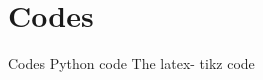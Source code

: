 \documentclass{beamer}
\begin{document}
 \section{Codes}
\begin{frame}{Codes}
Python code
\href{https://github.com/Panisha707/ASSIGNMENT02/blob/main/untitled18.py}{}
\newline
The latex- tikz code 
\href{https://github.com/Panisha707/ASSIGNMENT02/blob/main/main.tex}{}
\end{frame}
\end{document}
